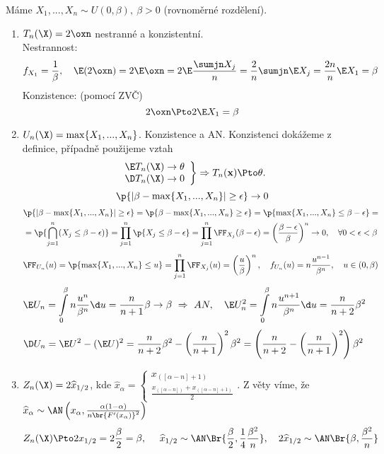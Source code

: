 \begin{example}
	Máme $X_1,...,X_n\sim U(0,\beta),~\beta>0$ (rovnoměrné rozdělení).\begin{enumerate}
		\item $T_n(\X)=2\oxn$ nestranné a konzistentní. \\ Nestrannost:
		$$ f_{X_1}=\frac{1}{\beta},~~~\E(2\oxn)=2\E \oxn=2\E\frac{\sumjn X_j}{n}=\frac{2}{n}\sumjn \E X_j=\frac{2n}{n}\E X_1=\beta $$
		Konzistence: (pomocí ZVČ)
		$$ 2\oxn\Pto2\E X_1=\beta $$
		\item $U_n(\X)=\max\{ X_1,...,X_n \}$. Konzistence a AN. Konzistenci dokážeme z definice, případně použijeme vztah
		$$ \left. \begin{array}{c}
	\E T_n(\X)\to\theta	\\ \D T_n(\X)\to 0
		\end{array}\right\}\Rightarrow T_n(\textbf{x})\Pto \theta . $$
		$$ \p{|\beta-\max\{X_1,...,X_n\}|\geq \epsilon}\to0 $$
		\[
		\begin{split}
		&\p{|\beta-\max\{X_1,...,X_n\}|\geq \epsilon}=\p{\beta-\max\{X_1,...,X_n\}\geq \epsilon}=\p{\max\{X_1,...,X_n\}\leq \beta-\epsilon}=\\&=\p{\bigcap\limits_{j=1}^n (X_j\leq \beta-\epsilon)}=\prod\limits_{j=1}^n\p{X_j\leq \beta-\epsilon}=\prod\limits_{j=1}^n\FF_{X_j}(\beta-\epsilon)=\left(\frac{\beta-\epsilon}{\beta}\right)^n\to0,~~~\forall0<\epsilon<\beta
		\end{split}
		\]
		$$ \FF_{U_n}(u)=\p{\max\{X_1,...,X_n\}\leq u}=\prod\limits_{j=1}^n\FF_{X_j}(u)=\left( \frac{u}{\beta} \right)^n,~~~f_{U_n}(u)=n\frac{u^{n-1}}{\beta^n},~~~u\in(0,\beta) $$
		$$ \E U_n=\int\limits_{0}^\beta n\frac{u^n}{\beta^n}\d u=\frac{n}{n+1}\beta\to \beta~\Rightarrow~AN,~~~\E U_n^2=\int\limits_{0}^\beta n\frac{u^{n+1}}{\beta^n}\d u=\frac{n}{n+2}\beta^2 $$
		$$\D U_n=\E U^2-(\E U)^2=\frac{n}{n+2}\beta^2-\left(\frac{n}{n+1}\right)^2\beta^2=\left( \frac{n}{n+2}-\left(\frac{n}{n+1}\right)^2 \right)\beta^2$$
		\item $Z_n(\X)=2\widehat{x}_{1/2}$, kde $\hat{x}_\alpha=\begin{cases}
		x_{([\alpha-n]+1)} \\ \frac{x_{([\alpha-n])}+x_{([\alpha-n]+1)}}{2}
		\end{cases}$. Z věty víme, že $\widehat{x}_\alpha\sim\AN\left( x_\alpha,\frac{\alpha(1-\alpha)}{n\br{F'(x_\alpha)}^2} \right)$
		$$ Z_n(\X)\Pto 2x_{1/2}=2\frac{\beta}{2}=\beta,~~~~\widehat{x}_{1/2}\sim\AN\Br{\frac{\beta}{2},\frac{1}{4}\frac{\beta^2}{n}},~~~2\widehat{x}_{1/2}\sim\AN\Br{\beta,\frac{\beta^2}{n}} $$
	\end{enumerate}
\end{example}
